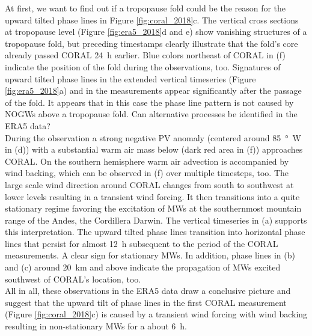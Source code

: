 At first, we want to find out if a tropopause fold could be the reason for the upward tilted phase lines in Figure \ref{fig:coral_2018}c. The vertical cross sections at tropopause level (Figure \ref{fig:era5_2018}d and e) show vanishing structures of a tropopause fold, but preceding timestamps clearly illustrate that the fold's core already passed CORAL \SI{24}{h} earlier. Blue colors northeast of CORAL in (f) indicate the position of the fold during the observations, too. Signatures of upward tilted phase lines in the extended vertical timeseries (Figure \ref{fig:era5_2018}a) and in the measurements appear significantly after the passage of the fold. It appears that in this case the phase line pattern is not caused by NOGWs above a tropopause fold. Can alternative processes be identified in the ERA5 data? \\
During the observation a strong negative PV anomaly (centered around \SI{85}{\degree W} in (d)) with a substantial warm air mass below (dark red area in (f)) approaches CORAL. On the southern hemisphere warm air advection is accompanied by wind backing, which can be observed in (f) over multiple timesteps, too. The large scale wind direction around CORAL changes from south to southwest at lower levels resulting in a transient wind forcing. It then transitions into a quite stationary regime favoring the excitation of MWs at the southernmost mountain range of the Andes, the Cordillera Darwin. The vertical timeseries in (a) supports this interpretation. The upward tilted phase lines transition into horizontal phase lines that persist for almost \SI{12}{h} subsequent to the period of the CORAL measurements. A clear sign for stationary MWs. In addition, phase lines in (b) and (c) around \SI{20}{\kilo\meter} and above indicate the propagation of MWs excited southwest of CORAL's location, too. \\
All in all, these observations in the ERA5 data draw a conclusive picture and suggest that the upward tilt of phase lines in the first CORAL measurement (Figure \ref{fig:coral_2018}c) is caused by a transient wind forcing with wind backing resulting in non-stationary MWs for a about \SI{6}{h}.
